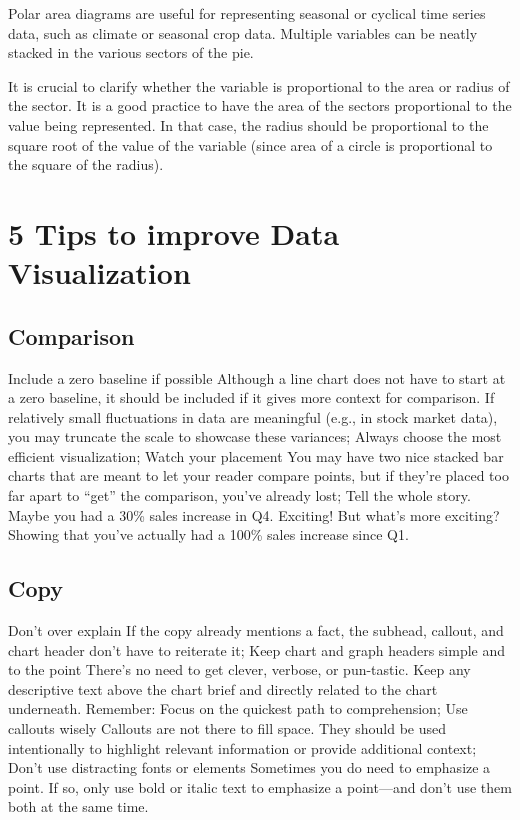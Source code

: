 \documentclass[]{book}
\theoremstyle{definition}
\theoremstyle{definition}
\theoremstyle{definition}
\theoremstyle{remark}
\begin{document}
Polar area diagrams are useful for representing seasonal or cyclical
time series data, such as climate or seasonal crop data. Multiple
variables can be neatly stacked in the various sectors of the pie.

It is crucial to clarify whether the variable is proportional to the
area or radius of the sector. It is a good practice to have the area of
the sectors proportional to the value being represented. In that case,
the radius should be proportional to the square root of the value of the
variable (since area of a circle is proportional to the square of the
radius).

\section{5 Tips to improve Data
Visualization}\label{tips-to-improve-data-visualization}

\subsection{Comparison}\label{comparison}

Include a zero baseline if possible Although a line chart does not have
to start at a zero baseline, it should be included if it gives more
context for comparison. If relatively small fluctuations in data are
meaningful (e.g., in stock market data), you may truncate the scale to
showcase these variances; Always choose the most efficient
visualization; Watch your placement You may have two nice stacked bar
charts that are meant to let your reader compare points, but if they're
placed too far apart to ``get'' the comparison, you've already lost;
Tell the whole story. Maybe you had a 30\% sales increase in Q4.
Exciting! But what's more exciting? Showing that you've actually had a
100\% sales increase since Q1.

\subsection{Copy}\label{copy}

Don't over explain If the copy already mentions a fact, the subhead,
callout, and chart header don't have to reiterate it; Keep chart and
graph headers simple and to the point There's no need to get clever,
verbose, or pun-tastic. Keep any descriptive text above the chart brief
and directly related to the chart underneath. Remember: Focus on the
quickest path to comprehension; Use callouts wisely Callouts are not
there to fill space. They should be used intentionally to highlight
relevant information or provide additional context; Don't use
distracting fonts or elements Sometimes you do need to emphasize a
point. If so, only use bold or italic text to emphasize a point---and
don't use them both at the same time.
\end{document}
